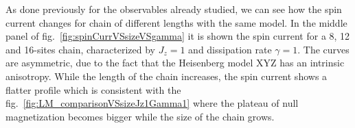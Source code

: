 


%
%
%

As done previously for the observables already studied, we can see how the spin current changes for chain of different lengths with the same model. In the middle panel of fig.~\ref{fig:spinCurrVSsizeVSgamma} it is shown the spin current for a 8, 12 and 16-sites chain, characterized by $J_z = 1$ and dissipation rate $\gamma = 1$. The curves are asymmetric, due to the fact that the Heisenberg model XYZ has an intrinsic anisotropy. While the length of the chain increases, the spin current shows a flatter profile which is consistent with the fig.~\ref{fig:LM_comparisonVSsizeJz1Gamma1} where the plateau of null magnetization becomes bigger while the size of the chain grows.

